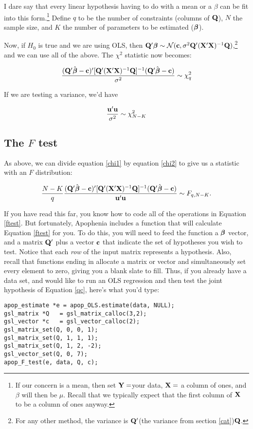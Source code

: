 I dare
say that every linear hypothesis having to do with a mean or a $\beta$ can be
fit into this form.\footnote{If our concern is a mean, then set
${\bf Y}=$your data, ${\bf X}=$ a column of ones, and $\beta$ will then be
$\mu$. Recall that we typically expect that the first column of ${\bf X}$ to
be a column of ones anyway.}
Define $q$ to be the number of constraints (columns
of ${\bf Q}$), $N$ the sample size, and $K$ the number of parameters to be
estimated (${\mbox{\boldmath$\beta$}}$).

Now, if $H_0$ is true and we are using OLS, then ${\bf Q}' {\mbox{\boldmath$\beta$}} \sim {\cal
N}({\bf c}, \sigma^2 {\bf Q}' ({\bf X}'{\bf X})^{-1} {\bf Q})$,\footnote{For any other
method, the variance is ${\bf Q}'$(the variance from section
\ref{cat})${\bf Q}$.} and we can use all of the above. The $\chi^2$
statistic now becomes:

\begin{equation}		\label{chi1}
{({\bf Q}'\hat{{\mbox{\boldmath$\beta$}}}- {\bf c})' [{\bf Q}' ({\bf X}'{\bf X})^{-1} {\bf Q}]^{-1} ({\bf Q}' \hat{{\mbox{\boldmath$\beta$}}}- {\bf c})
\over \sigma^2} \sim \chi^2_q
\end{equation}

If we are testing a variance, we'd have 

\begin{equation}		\label{chi2}
{{\bf u}' {\bf u} \over \sigma^2} \sim \chi^2_{N-K}
\end{equation}


\subsection{The $F$ test}\label{ftestsec}

As above, we can divide equation \ref{chi1} by equation \ref{chi2} to give us a statistic
with an $F$ distribution:

\begin{equation}	
{N-K\over q}
{({\bf Q}'\hat{{\mbox{\boldmath$\beta$}}}- {\bf c})' [{\bf Q}' ({\bf X}'{\bf X})^{-1} {\bf Q}]^{-1} ({\bf Q}' \hat{{\mbox{\boldmath$\beta$}}}- {\bf c})
\over {\bf u}' {\bf u}} \sim F_{q,N-K}. \label{ftest}
\end{equation}	

If you have read this far, you know how to code all of the operations
in Equation \ref{ftest}.  But fortunately, 
Apophenia includes a function that will calculate Equation \ref{ftest}
for you.
To do this, you will need to feed the function a ${\mbox{\boldmath$\beta$}}$ vector, and a
matrix ${\bf Q}'$ plus a vector ${\bf c}$ that indicate the set of hypotheses
you wish to test. Notice that each {\em row} of the input matrix represents a
hypothesis. Also, recall that functions ending in  allocate
a matrix or vector and simultaneously set every element to zero, giving
you a blank slate to fill. Thus, if you already have a data set, and
would like to run an OLS regression and then test the joint hypothesis
of Equation \ref{qc}, here's what you'd type:
\begin{lstlisting}
apop_estimate *e = apop_OLS.estimate(data, NULL);
gsl_matrix *Q   = gsl_matrix_calloc(3,2);
gsl_vector *c   = gsl_vector_calloc(2);
gsl_matrix_set(Q, 0, 0, 1);
gsl_matrix_set(Q, 1, 1, 1);
gsl_matrix_set(Q, 1, 2, -2);
gsl_vector_set(Q, 0, 7);
apop_F_test(e, data, Q, c);
\end{lstlisting}

